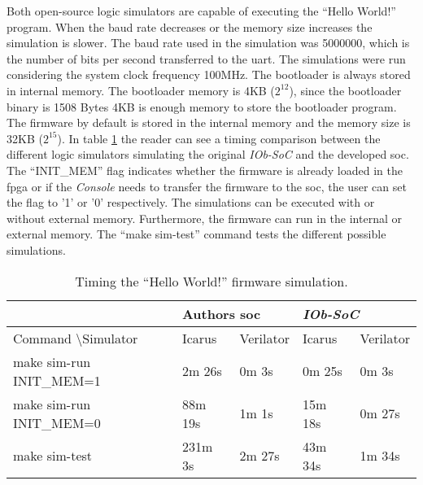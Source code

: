 Both open-source logic simulators are capable of executing the \enquote{Hello World!} program. When the baud rate decreases or the memory size increases the simulation is slower. The baud rate used in the simulation was 5000000, which is the number of bits per second transferred to the \acrshort{uart}. The simulations were run considering the system clock frequency 100MHz. The bootloader is always stored in internal memory. The bootloader memory is 4KB ($2^12$), since the bootloader binary is 1508 Bytes 4KB is enough memory to store the bootloader program. The firmware by default is stored in the internal memory and the memory size is 32KB ($2^15$). In table \ref{tab:hello_sim} the reader can see a timing comparison between the different logic simulators simulating the original \textit{IOb-SoC} and the developed \acrshort{soc}. The \enquote{INIT\_MEM} flag indicates whether the firmware is already loaded in the \acrshort{fpga} or if the \textit{Console} needs to transfer the firmware to the \acrshort{soc}, the user can set the flag to '1' or '0' respectively. The simulations can be executed with or without external memory. Furthermore, the firmware can run in the internal or external memory. The \enquote{make sim-test} command tests the different possible simulations.

\begin{table}[!ht]
    \centering
    \begin{tabular}{l|ll|ll|}
    \cline{2-5}
                                                           & \multicolumn{2}{l|}{Authors \acrshort{soc}} & \multicolumn{2}{l|}{\textit{IOb-SoC}}    \\ \hline
    \multicolumn{1}{|l|}{Command \textbackslash Simulator} & \multicolumn{1}{l|}{Icarus}  & Verilator & \multicolumn{1}{l|}{Icarus}  & Verilator \\ \hline
    \multicolumn{1}{|l|}{make sim-run INIT\_MEM=1}              & \multicolumn{1}{l|}{2m 26s}  & 0m 3s     & \multicolumn{1}{l|}{0m 25s}  & 0m 3s     \\ \hline
    \multicolumn{1}{|l|}{make sim-run INIT\_MEM=0}              & \multicolumn{1}{l|}{88m 19s} & 1m 1s     & \multicolumn{1}{l|}{15m 18s} & 0m 27s    \\ \hline
    \multicolumn{1}{|l|}{make sim-test}                         & \multicolumn{1}{l|}{231m 3s} & 2m 27s    & \multicolumn{1}{l|}{43m 34s} & 1m 34s    \\ \hline
    \end{tabular}
    \caption{Timing the \enquote{Hello World!} firmware simulation.}
    \label{tab:hello_sim}
\end{table}

